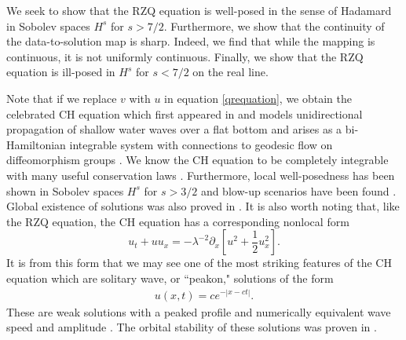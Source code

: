 \documentclass[reqno]{amsart}
\theoremstyle{plain}
\numberwithin{equation}{section}
\newcommand{\p}{\partial}
\begin{document}
We seek to show that the RZQ equation is well-posed in the sense of Hadamard in Sobolev spaces $H^s$ for $s>7/2$.  Furthermore, we show that the continuity of the data-to-solution map is sharp.  Indeed, we find that while the mapping is continuous, it is not uniformly continuous.  Finally, we show that the RZQ equation is ill-posed in $H^s$ for $s<7/2$ on the real line.

Note that if we replace $v$ with $u$ in equation \eqref{qrequation}, we obtain the celebrated CH equation which first appeared in \cite{fuchssteiner1981} and models unidirectional propagation of shallow water waves over a flat bottom and arises as a bi-Hamiltonian integrable system with connections to geodesic flow on diffeomorphism groups \cite{camassa1993, const4, misiolek1998}.  We know the CH equation to be completely integrable with many useful conservation laws \cite{len1, mc1}.  Furthermore, local well-posedness has been shown in Sobolev spaces $H^s$ for $s>3/2$ and blow-up scenarios have been found \cite{const2, const3, jnz1, lo1, mc1}.  Global existence of solutions was also proved in \cite{bressan1, bressan2, jzz1}.  It is also worth noting that, like the RZQ equation, the CH equation has a corresponding nonlocal form
\begin{equation}\label{CH-nonloc}
    u_t+uu_x = -\lambda ^{-2} \p_x\left[u^2+\frac12u_x^2\right].
\end{equation}
It is from this form that we may see one of the most striking features of the CH equation which are solitary wave, or ``peakon," solutions of the form 
\begin{align}\label{ch-peakon}
    u(x,t) = ce^{-|x-ct|}.
\end{align}    These are weak solutions with a peaked profile and numerically equivalent wave speed and amplitude \cite{camassa1993}.  The orbital stability of these solutions was proven in \cite{const5}.
\end{document}
